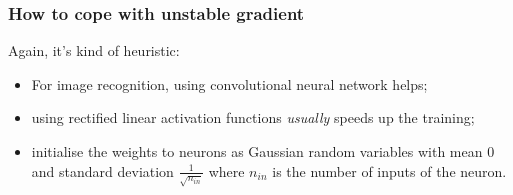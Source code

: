 \documentclass[usenames,dvipsnames]{beamer}
\begin{document}

\begin{frame}
\frametitle{How to cope with unstable gradient}

Again, it's kind of heuristic:

\begin{itemize}
  \item For image recognition, using convolutional neural network helps;
  \item using rectified linear activation functions \emph{usually} speeds up the training;
  \item initialise the weights to neurons as Gaussian random variables with mean $0$ and standard deviation $\frac{1}{\sqrt{n_{in}}}$ where $n_{in}$ is the number of inputs of the neuron.
\end{itemize}


	
\end{frame}











\end{document}
